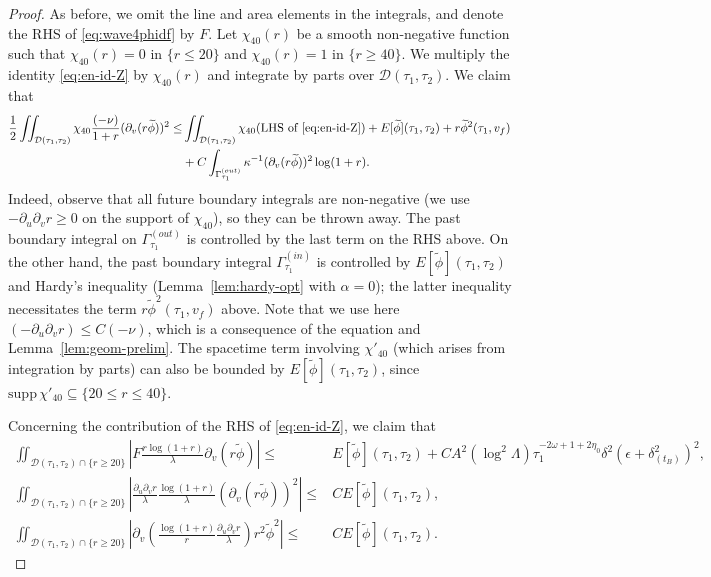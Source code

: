 \documentclass[10pt, reqno]{amsart}
\theoremstyle{definition}
\theoremstyle{remark}
\theoremstyle{conjecture}
\numberwithin{equation}{section}
\newcommand{\set}[1]{\{#1\}}
\newcommand{\rd}{\partial}
\newcommand{\0}{\emptyset}
\newcommand{\alp}{\alpha}
\newcommand{\Gmm}{\Gamma}
\newcommand{\dlt}{\delta}
\newcommand{\eps}{\epsilon}
\newcommand{\kpp}{\kappa}
\newcommand{\lmb}{\lambda}
\newcommand{\Lmb}{\Lambda}
\newcommand{\omg}{\omega}
\newcommand{\calD}{\mathcal D}
\newcommand{\dur}{\nu}
\newcommand{\dvr}{\lmb}
\newcommand{\phibg}{\overline{\phi}}				%
\newcommand{\phidf}{\widetilde{\phi}}				%
\newcommand{\Abs}[1]{\left\vert #1 \right\vert}
\begin{document}
\begin{proof}
As before, we omit the line and area elements in the integrals, and denote the RHS of \eqref{eq:wave4phidf} by $F$.
Let $\chi_{40}(r)$ be a smooth non-negative function such that $\chi_{40}(r) = 0$ in $\set{r \leq 20}$ and $\chi_{40}(r) = 1$ in $\set{r \geq 40}$.
We multiply the identity \eqref{eq:en-id-Z} by $\chi_{40}(r)$ and integrate by parts over $\calD(\tau_{1}, \tau_{2})$. We claim that
\begin{equation} \label{eq:en-dvrphi-Z}
\begin{aligned}
	\frac{1}{2} \iint_{\calD(\tau_{1}, \tau_{2})} \chi_{40} \frac{(-\dur)}{1+r} (\rd_{v} (r \phidf))^{2} 
	\leq & \iint_{\calD(\tau_{1}, \tau_{2})} \chi_{40} (\hbox{LHS of \eqref{eq:en-id-Z}}) 
		+ E[\phidf](\tau_{1}, \tau_{2}) + r \phidf^{2}(\tau_{1}, v_{f}) \\
		&+ C  \int_{\Gmm^{(out)}_{\tau_{1}}} \kpp^{-1} (\rd_{v} (r \phidf))^{2} \log(1 + r) .
\end{aligned}
\end{equation}
Indeed, observe that all future boundary integrals are non-negative (we use $-\rd_{u} \rd_{v} r \geq 0$ on the support of $\chi_{40}$), so they can be thrown away. The past boundary integral on $\Gmm^{(out)}_{\tau_{1}}$ is controlled by the last term on the RHS above.
On the other hand, the past boundary integral $\Gmm^{(in)}_{\tau_{1}}$ is controlled by $E[\phidf](\tau_{1}, \tau_{2})$ and Hardy's inequality (Lemma~\ref{lem:hardy-opt} with $\alp = 0$); the latter inequality necessitates the term $r \phidf^{2}(\tau_{1}, v_{f})$ above. Note that we use here $(-\rd_u \rd_v r)\leq C(-\nu)$, which is a consequence of the equation and Lemma~\ref{lem:geom-prelim}. The spacetime term involving $\chi'_{40}$ (which arises from integration by parts) can also be bounded by $E[\phidf](\tau_{1}, \tau_{2})$, since $\mathrm{supp} \, \chi'_{40} \subseteq \set{20 \leq r \leq 40}$.

Concerning the contribution of the RHS of \eqref{eq:en-id-Z}, we claim that
\begin{align} 
\iint_{\calD(\tau_{1}, \tau_{2}) \cap \set{r \geq 20}} \Abs{F \frac{r \log (1+r)}{\dvr} \rd_{v} (r \phidf)} 
\leq & E[\phidf](\tau_{1}, \tau_{2}) +  C A^{2} (\log^{2} \Lmb) \tau_{1}^{-2 \omg + 1 + 2 \eta_{0}} \dlt^{2} \left( \eps + \dlt_{(t_{B})}^{2} \right)^{2}	,		\label{eq:en-dvrphi-Z1} \\
\iint_{\calD(\tau_{1}, \tau_{2}) \cap \set{r \geq 20}} \Abs{\frac{\rd_{u} \rd_{v} r}{\dvr} \frac{\log (1+r)}{\dvr} (\rd_{v} (r \phidf))^{2}} 
\leq & C E[\phidf](\tau_{1}, \tau_{2})	,	\label{eq:en-dvrphi-Z2} \\
\iint_{\calD(\tau_{1}, \tau_{2}) \cap \set{r \geq 20}}\Abs{\rd_{v} \left(\frac{\log (1+r)}{r} \frac{\rd_{u} \rd_{v} r}{\dvr}\right) r^{2} \phidf^{2} } 
\leq & C E[\phidf](\tau_{1}, \tau_{2}) .			\label{eq:en-dvrphi-Z3}
\end{align}


\end{proof}
\end{document}
